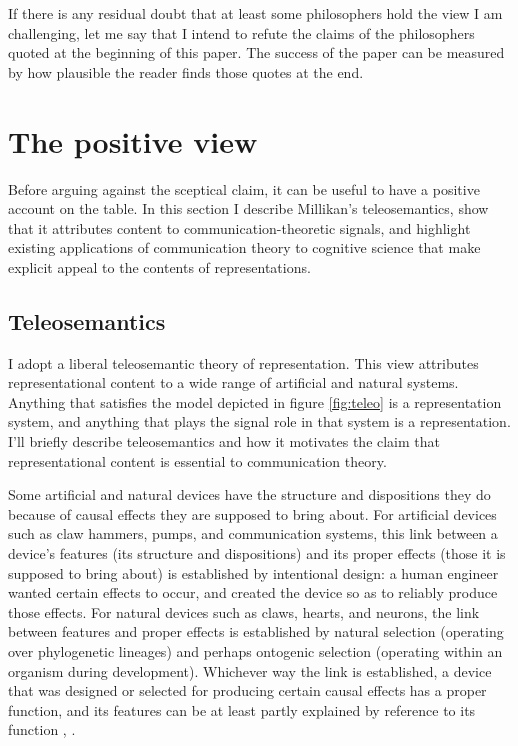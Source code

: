 \documentclass[12pt]{article}
\begin{document}
If there is any residual doubt that at least some philosophers hold the view I am challenging, let me say that I intend to refute the claims of the philosophers quoted at the beginning of this paper.
The success of the paper can be measured by how plausible the reader finds those quotes at the end.


\section{The positive view}\label{sec:positive}

Before arguing against the sceptical claim, it can be useful to have a positive account on the table.
In this section I describe Millikan's teleosemantics, show that it attributes content to communication-theoretic signals, and highlight existing applications of communication theory to cognitive science that make explicit appeal to the contents of representations.

\subsection{Teleosemantics}
I adopt a liberal teleosemantic theory of representation.
This view attributes representational content to a wide range of artificial and natural systems.
Anything that satisfies the model depicted in figure \ref{fig:teleo} is a representation system, and anything that plays the signal role in that system is a representation.
I'll briefly describe teleosemantics and how it motivates the claim that representational content is essential to communication theory.



Some artificial and natural devices have the structure and dispositions they do because of causal effects they are supposed to bring about.
For artificial devices such as claw hammers, pumps, and communication systems, this link between a device's features (its structure and dispositions) and its proper effects (those it is supposed to bring about) is established by intentional design: a human engineer wanted certain effects to occur, and created the device so as to reliably produce those effects.
For natural devices such as claws, hearts, and neurons, the link between features and proper effects is established by natural selection (operating over phylogenetic lineages) and perhaps ontogenic selection (operating within an organism during development).
Whichever way the link is established, a device that was designed or selected for producing certain causal effects has a proper function, and its features can be at least partly explained by reference to its function \citep[$\S\S$1-2]{millikan1984language}, \citep[$\S$2]{millikan1993white}.
\end{document}
